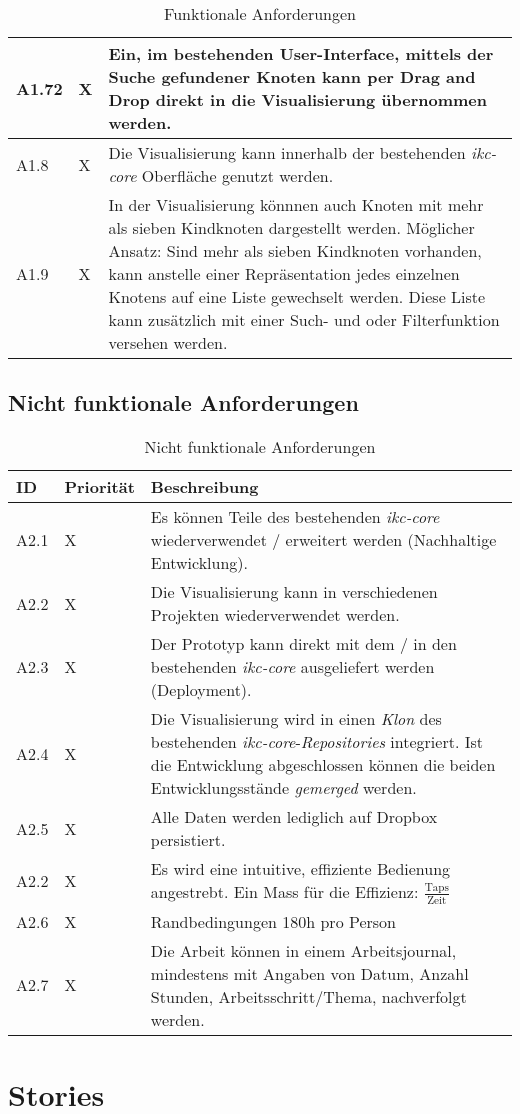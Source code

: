 \begin{table}
\begin{tabular}{|p{1.1cm} | p{1.6cm} | p{8cm}|}
    A1.72 & X & Ein, im bestehenden User-Interface, mittels der Suche gefundener Knoten kann per Drag and Drop direkt in die Visualisierung übernommen werden.\\\hline 
    A1.8 & X & Die Visualisierung kann innerhalb der bestehenden \textit{ikc-core} Oberfläche genutzt werden.\\\hline 
    A1.9 & X & In der Visualisierung könnnen auch Knoten mit mehr als sieben Kindknoten dargestellt werden. Möglicher Ansatz: Sind mehr als sieben Kindknoten vorhanden, kann anstelle einer Repräsentation jedes einzelnen Knotens auf eine Liste gewechselt werden. Diese Liste kann zusätzlich mit einer Such- und oder Filterfunktion versehen werden.\\\hline     
     
  \end{tabular}
    \caption{Funktionale Anforderungen}
  \label{tab:funktionale-anforderungen}
\end{table}

\subsection{Nicht funktionale Anforderungen}

\begin{table}
  \centering
  \begin{tabular}{|p{0.9cm} | p{1.6cm} | p{8cm}|}
  \hline
    ID & Priorität & Beschreibung \\\hline
    A2.1 & X & Es können Teile des bestehenden \textit{ikc-core} wiederverwendet / erweitert werden (Nachhaltige Entwicklung).\\\hline
    A2.2 & X & Die Visualisierung kann in verschiedenen Projekten wiederverwendet werden.\\\hline
    A2.3 & X & Der Prototyp kann direkt mit dem / in den bestehenden \textit{ikc-core} ausgeliefert werden (Deployment).\\\hline
    A2.4 & X & Die Visualisierung wird in einen \textit{Klon} des bestehenden \textit{ikc-core}-\textit{Repositories} integriert. Ist die Entwicklung abgeschlossen können die beiden Entwicklungsstände \textit{gemerged} werden.\\\hline
    A2.5 & X & Alle Daten werden lediglich auf Dropbox persistiert.\\\hline
    A2.2 & X & Es wird eine intuitive, effiziente Bedienung angestrebt. Ein Mass für die Effizienz: $\frac{\text{Taps}}{\text{Zeit}}$\\\hline
    A2.6 & X & Randbedingungen 180h pro Person\\\hline
    A2.7 & X & Die Arbeit können in einem Arbeitsjournal, mindestens mit Angaben von Datum, Anzahl Stunden, Arbeitsschritt/Thema, nachverfolgt werden.\\\hline
  \end{tabular}
    \caption{Nicht funktionale Anforderungen}
  \label{tab:nicht-funktionale-anforderungen}
\end{table}

\section{Stories}
